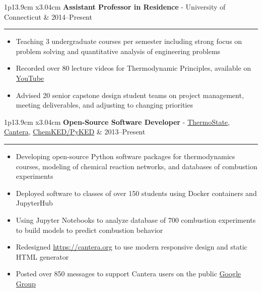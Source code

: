 \documentclass[11pt]{article}
\newenvironment{cvevent}[3]{%
%
\begin{tabular*}{1\textwidth}{p{13.9cm} x{3.04cm}}%
    \textbf{#2} - \textcolor{bgcol}{#3} & \vspace{2.5pt}\textcolor{sectcol}{#1}%
\end{tabular*}%

\vspace{-8pt}%
\textcolor{softcol}{\hrule}%
\vspace{6pt}%
}{
\vspace{6pt}
}
\begin{document}
\begin{cvevent}{2014--Present}%
{Assistant Professor in Residence}%
{University of Connecticut}%
\begin{itemize}
    \item Teaching 3 undergraduate courses per semester including strong focus on problem
    solving and quantitative analysis of engineering problems
    \item Recorded over 80 lecture videos for Thermodynamic Principles, available on
    \href{https://www.youtube.com/playlist?list=PLnOxmF4n89SXsKxFb6ug0ThMNpqJST5_X}{YouTube}
    \item Advised 20 senior capstone design student teams on project management, meeting
    deliverables, and adjusting to changing priorities
\end{itemize}
\end{cvevent}

\begin{cvevent}{2013--Present}
{Open-Source Software Developer}
{\href{https://github.com/bryanwweber/thermostate}{ThermoState},
\href{https://github.com/cantera}{Cantera},
\href{https://github.com/pr-omethe-us/pyked}{ChemKED/PyKED}}
\begin{itemize}
    \item Developing open-source Python software packages for thermodynamics courses,
    modeling of chemical reaction networks, and databases of combustion experiments
    \item Deployed software to classes of over 150 students using Docker containers and
    JupyterHub
    \item Using Jupyter Notebooks to analyze database of 700 combustion experiments to
    build models to predict combustion behavior
    \item Redesigned \url{https://cantera.org} to use modern responsive design and static
    HTML generator
    \item Posted over 850 messages to support Cantera users on the public
    \href{https://groups.google.com/forum/#!forum/cantera-users}{Google Group}
\end{itemize}
\end{cvevent}
\end{document}
